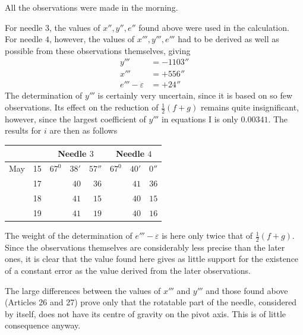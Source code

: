 All the observations were made in the morning.

For needle $3$, the values of $x'',y'',e''$ found above were used in the calculation. For needle $4$, however, the values of $x''',y''',e'''$ had to be derived as well as possible from these observations themselves, giving
\[
\begin{aligned}
y'''&=-1103''\\
x'''&=+556''\\
e'''-\varepsilon&=+24''
\end{aligned}
\]
The determination of $y'''$ is certainly very uncertain, since it is based on so few observations. Its effect on the reduction of $\tfrac12(f+g)$ remains quite insignificant, however, since the largest coefficient of $y'''$ in equations I is only $0.00341$. The results for $i$ are then as follows
\begin{center}
\begin{tabular}{rr||rrr||rrr}
\multicolumn{2}{c||}{}&\multicolumn{3}{c||}{Needle $3$}&\multicolumn{3}{c}{Needle $4$}\\\hline
May&15&$67^0$&$38'$&$57''$&$67^0$&$40'$&$0''$\\
&17&&$40$&$36$&&$41$&$36$\\
&18&&$41$&$15$&&$40$&$15$\\
&19&&$41$&$19$&&$40$&$16$
\end{tabular}
\end{center}
The weight of the determination of $e'''-\varepsilon$ is here only twice that of $\tfrac12(f+g)$. Since the observations themselves are considerably less precise than the later ones, it is clear that the value found here gives as little support for the existence of a constant error as the value derived from the later observations.

The large differences between the values of $x'''$ and $y'''$ and those found above (Articles 26 and 27) prove only that the rotatable part of the needle, considered by itself, does not have its centre of gravity on the pivot axis. This is of little consequence anyway.

